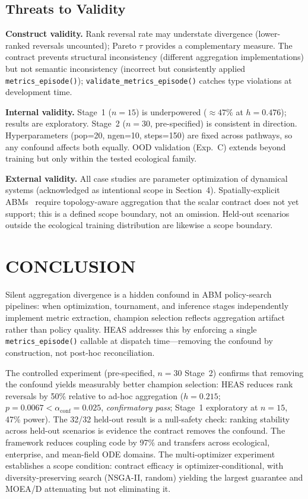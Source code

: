 \documentclass{wscpaperproc}
\begin{document}
\subsection{Threats to Validity}

\textbf{Construct validity.} Rank reversal rate may understate divergence
(lower-ranked reversals uncounted); Pareto $\tau$ provides a complementary
measure. The contract prevents structural inconsistency (different aggregation
implementations) but not semantic inconsistency (incorrect but consistently
applied \texttt{metrics\_episode()}); \texttt{validate\_metrics\_episode()}
catches type violations at development time.

\textbf{Internal validity.} Stage~1 ($n\!=\!15$) is underpowered ($\approx\!47\%$
at $h\!=\!0.476$); results are exploratory. Stage~2 ($n\!=\!30$, pre-specified)
is consistent in direction. Hyperparameters (pop=20, ngen=10, steps=150) are
fixed across pathways, so any confound affects both equally. OOD validation
(Exp.~C) extends beyond training but only within the tested ecological family.

\textbf{External validity.} All case studies are parameter optimization of
dynamical systems (acknowledged as intentional scope in Section~4). Spatially-explicit
ABMs~\cite{wilensky1999netlogo,collier2022repast4py} require topology-aware
aggregation that the scalar contract does not yet support; this is a defined
scope boundary, not an omission. Held-out scenarios outside the ecological
training distribution are likewise a scope boundary.

\section{CONCLUSION}

Silent aggregation divergence is a hidden confound in ABM policy-search
pipelines: when optimization, tournament, and inference stages independently
implement metric extraction, champion selection reflects aggregation artifact
rather than policy quality. HEAS addresses this by enforcing a single
\texttt{metrics\_episode()} callable at dispatch time---removing the confound by
construction, not post-hoc reconciliation.

The controlled experiment (pre-specified, $n\!=\!30$ Stage~2) confirms that
removing the confound yields measurably better champion selection: HEAS reduces
rank reversals by 50\% relative to ad-hoc aggregation ($h\!=\!0.215$;
$p\!=\!0.0067 < \alpha_{\text{conf}}\!=\!0.025$, \emph{confirmatory pass};
Stage~1 exploratory at $n\!=\!15$, 47\% power). The 32/32 held-out result is a
null-safety check: ranking stability across held-out scenarios is evidence the
contract removes the confound. The framework reduces coupling code by 97\% and
transfers across ecological, enterprise, and mean-field ODE domains. The
multi-optimizer experiment establishes a scope condition: contract efficacy is
optimizer-conditional, with diversity-preserving search (NSGA-II, random)
yielding the largest guarantee and MOEA/D attenuating but not eliminating it.
\end{document}
